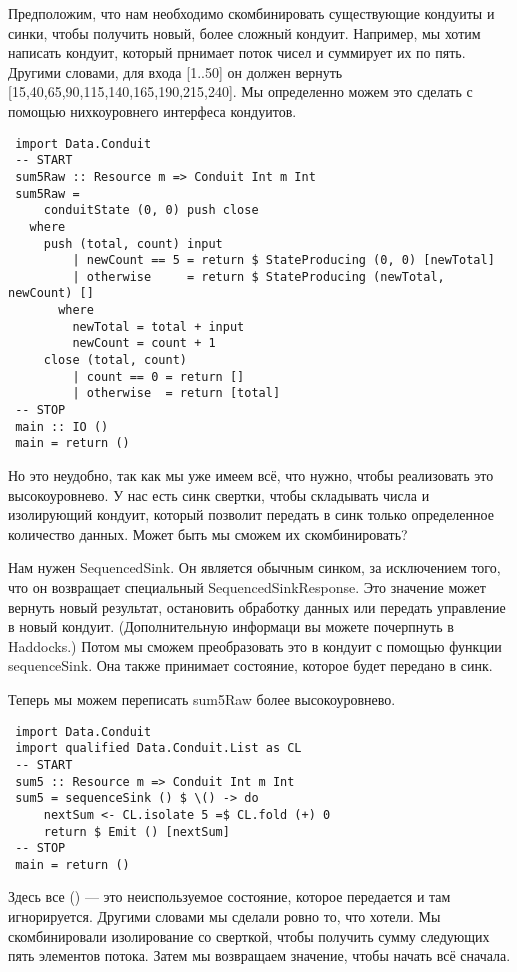 Предположим, что нам необходимо скомбинировать существующие кондуиты  и  синки, чтобы получить новый, более сложный кондуит. Например, мы хотим написать кондуит, который прнимает поток чисел и суммирует их по пять. Другими словами, для входа [1..50] он должен вернуть [15,40,65,90,115,140,165,190,215,240]. Мы определенно можем это сделать с помощью нихкоуровнего интерфеса кондуитов.
\begin{lstlisting}
 import Data.Conduit
 -- START
 sum5Raw :: Resource m => Conduit Int m Int
 sum5Raw =
     conduitState (0, 0) push close
   where
     push (total, count) input
         | newCount == 5 = return $ StateProducing (0, 0) [newTotal]
         | otherwise     = return $ StateProducing (newTotal, newCount) []
       where
         newTotal = total + input
         newCount = count + 1
     close (total, count)
         | count == 0 = return []
         | otherwise  = return [total]
 -- STOP
 main :: IO ()
 main = return ()
\end{lstlisting}
Но это неудобно, так как мы уже имеем всё, что нужно, чтобы реализовать это высокоуровнево. У нас есть синк свертки, чтобы складывать числа и изолирующий кондуит, который позволит передать в синк только определенное количество данных. Может быть мы сможем их скомбинировать?
 
Нам нужен SequencedSink. Он является обычным синком, за исключением того, что он возвращает специальный SequencedSinkResponse. Это значение может вернуть новый результат, остановить обработку данных или передать управление в новый кондуит. (Дополнительную информаци вы можете почерпнуть в Haddocks.) Потом мы сможем преобразовать это в кондуит с помощью функции sequenceSink. Она также принимает состояние, которое будет передано в синк.
 
 Теперь мы можем переписать sum5Raw более высокоуровнево.
 \begin{lstlisting}
 import Data.Conduit
 import qualified Data.Conduit.List as CL
 -- START
 sum5 :: Resource m => Conduit Int m Int
 sum5 = sequenceSink () $ \() -> do
     nextSum <- CL.isolate 5 =$ CL.fold (+) 0
     return $ Emit () [nextSum]
 -- STOP
 main = return ()
 \end{lstlisting}
Здесь все () --- это  неиспользуемое состояние, которое передается и там игнорируется. Другими словами мы сделали ровно то, что хотели. Мы скомбинировали изолирование со сверткой, чтобы получить сумму следующих пять элементов потока. Затем мы возвращаем значение, чтобы начать всё сначала.
 
